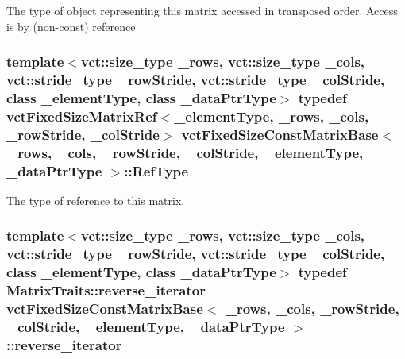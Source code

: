 The type of object representing this matrix accessed in transposed order. Access is by (non-\/const) reference \hypertarget{classvct_fixed_size_const_matrix_base_a9745538b98120d767fe2b9a9ba984e80}{
\subsubsection[{Ref\-Type}]{\setlength{\rightskip}{0pt plus 5cm}template$<$vct\-::size\-\_\-type \-\_\-rows, vct\-::size\-\_\-type \-\_\-cols, vct\-::stride\-\_\-type \-\_\-row\-Stride, vct\-::stride\-\_\-type \-\_\-col\-Stride, class \-\_\-element\-Type, class \-\_\-data\-Ptr\-Type$>$ typedef {\bf vct\-Fixed\-Size\-Matrix\-Ref}$<$\-\_\-element\-Type, \-\_\-rows, \-\_\-cols, \-\_\-row\-Stride, \-\_\-col\-Stride$>$ {\bf vct\-Fixed\-Size\-Const\-Matrix\-Base}$<$ \-\_\-rows, \-\_\-cols, \-\_\-row\-Stride, \-\_\-col\-Stride, \-\_\-element\-Type, \-\_\-data\-Ptr\-Type $>$\-::{\bf Ref\-Type}}}\label{classvct_fixed_size_const_matrix_base_a9745538b98120d767fe2b9a9ba984e80}
The type of reference to this matrix. \hypertarget{classvct_fixed_size_const_matrix_base_a7611e666969b09bd846c46a1a85401b0}{
\subsubsection[{reverse\-\_\-iterator}]{\setlength{\rightskip}{0pt plus 5cm}template$<$vct\-::size\-\_\-type \-\_\-rows, vct\-::size\-\_\-type \-\_\-cols, vct\-::stride\-\_\-type \-\_\-row\-Stride, vct\-::stride\-\_\-type \-\_\-col\-Stride, class \-\_\-element\-Type, class \-\_\-data\-Ptr\-Type$>$ typedef {\bf Matrix\-Traits\-::reverse\-\_\-iterator} {\bf vct\-Fixed\-Size\-Const\-Matrix\-Base}$<$ \-\_\-rows, \-\_\-cols, \-\_\-row\-Stride, \-\_\-col\-Stride, \-\_\-element\-Type, \-\_\-data\-Ptr\-Type $>$\-::{\bf reverse\-\_\-iterator}}}\label{classvct_fixed_size_const_matrix_base_a7611e666969b09bd846c46a1a85401b0}
